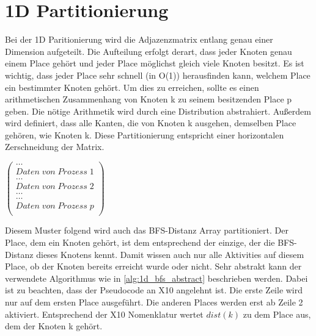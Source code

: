 

\section{1D Partitionierung} %
\label{sec:1d_partitionierung}
Bei der 1D Paritionierung wird die Adjazenzmatrix entlang genau einer Dimension aufgeteilt. Die Aufteilung erfolgt derart, dass jeder Knoten genau einem Place gehört und jeder Place möglichst gleich viele Knoten besitzt. Es ist wichtig, dass jeder Place sehr schnell (in O(1)) herausfinden kann, welchem Place ein bestimmter Knoten gehört. Um dies zu erreichen, sollte es einen arithmetischen Zusammenhang von Knoten k zu seinem besitzenden Place p geben. Die nötige Arithmetik wird durch eine Distribution abstrahiert. Außerdem wird definiert, dass alle Kanten, die von Knoten k ausgehen, demselben Place gehören, wie Knoten k. Diese Partitionierung entspricht einer horizontalen Zerschneidung der Matrix.

\begin{center}
$\left( \begin{array}{c}
	\dots \\ Daten\;von\;Prozess\;1 \\	\hline
	\dots \\ Daten\;von\;Prozess\;2 \\	\hline
	\dots \\	\hline
	\dots \\ Daten\;von\;Prozess\;p \\
\end{array} \right)$
\end{center}

Diesem Muster folgend wird auch das BFS-Distanz Array partitioniert. Der Place, dem ein Knoten gehört, ist dem entsprechend der einzige, der die BFS-Distanz dieses Knotens kennt. Damit wissen auch nur alle Aktivities auf diesem Place, ob der Knoten bereits erreicht wurde oder nicht. Sehr abstrakt kann der verwendete Algorithmus wie in \ref{alg:1d_bfs_abstract} beschrieben werden. Dabei ist zu beachten, dass der Pseudocode an X10 angelehnt ist. Die erste Zeile wird nur auf dem ersten Place ausgeführt. Die anderen Places werden erst ab Zeile 2 aktiviert. Entsprechend der X10 Nomenklatur wertet $dist(k)$ zu dem Place aus, dem der Knoten k gehört.

